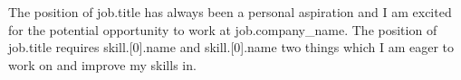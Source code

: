 The position of {{job.title}} has always been a personal aspiration and I am excited for the potential opportunity to work at {{job.company_name}}. The position of {{job.title}} requires {{skill.[0].name}} and {{skill.[0].name}} two things which I am eager to work on and improve my skills in.
